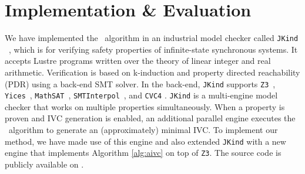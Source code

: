\section{Implementation \& Evaluation}
\label{sec:impl}

We have implemented the \aivcalg ~algorithm
in an industrial model checker called \texttt{JKind} ~\cite{jkind},
which is for verifying safety properties of  infinite-state synchronous systems.
It accepts Lustre programs \cite{Halbwachs91:lustre}
written over the theory of linear integer and real arithmetic.
Verification is based on k-induction and property directed reachability (PDR) using a back-end SMT solver.
In the
back-end, \texttt{JKind} supports \texttt{Z3}~\cite{DeMoura08:z3},
\texttt{Yices}~\cite{Dutertre06:yices}, \texttt{MathSAT}~\cite{Cimatti2013:MathSAT},
\texttt{SMTInterpol}~\cite{Christ2012:SMTInterpol}, and \texttt{CVC4} \cite{barrett2011cvc4}. \texttt{JKind} is a multi-engine model checker that works on multiple properties simultaneously. When a property is
proven and IVC generation is enabled, an additional parallel engine
executes the \ucalg ~algorithm \cite{Ghass16} to generate an (approximately) minimal IVC. To implement our method, we have made use of this engine and also extended \texttt{JKind} with a new engine that
implements Algorithm \ref{alg:aivc} on top of \texttt{Z3}.
The source code is publicly available on \cite{mygit}.



%

 